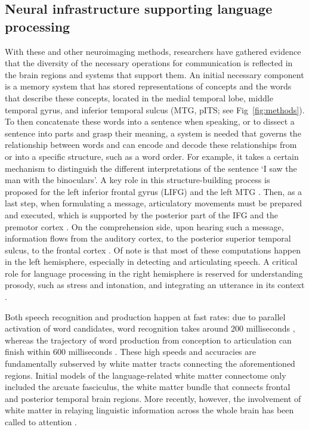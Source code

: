 \subsection{Neural infrastructure supporting language processing} 

With these and other neuroimaging methods, researchers have gathered evidence that the diversity of the necessary operations for communication is reflected in the brain regions and systems that support them. An initial necessary component is a memory system that has stored representations of concepts and the words that describe these concepts, located in the medial temporal lobe, middle temporal gyrus, and inferior temporal sulcus (MTG, pITS; see Fig~\ref{fig:methods}). To then concatenate these words into a sentence when speaking, or to dissect a sentence into parts and grasp their meaning, a system is needed that governs the relationship between words and can encode and decode these relationships from or into a specific structure, such as a word order. For example, it takes a certain mechanism to distinguish the different interpretations of the sentence `I saw the man with the binoculars'. A key role in this structure-building process is proposed for the left inferior frontal gyrus (LIFG) and the left MTG \citep{giglio2022,hagoort2017}. Then, as a last step, when formulating a message, articulatory movements must be prepared and executed, which is supported by the posterior part of the IFG and the premotor cortex \citep[PM; ][]{hickok2007}. On the comprehension side, upon hearing such a message, information flows from the auditory cortex, to the posterior superior temporal sulcus, to the frontal cortex \citep{friederici2012}. Of note is that most of these computations happen in the left hemisphere, especially in detecting and articulating speech. A critical role for language processing in the right hemisphere is reserved for understanding prosody, such as stress and intonation, and integrating an utterance in its context \citep{beaucousin2006,vigneau2011}.


Both speech recognition and production happen at fast rates: due to parallel activation of word candidates, word recognition takes around 200 milliseconds \citep{mcclelland1986}, whereas the trajectory of word production from conception to articulation can finish within 600 milliseconds \citep{indefrey2004}. These high speeds and accuracies are fundamentally subserved by white matter tracts connecting the aforementioned regions. Initial models of the language-related white matter connectome only included the arcuate fasciculus, the white matter bundle that connects frontal and posterior temporal brain regions. More recently, however, the involvement of white matter in relaying linguistic information across the whole brain has been called to attention \citep{przezdzik2019,tyler2007}.  


